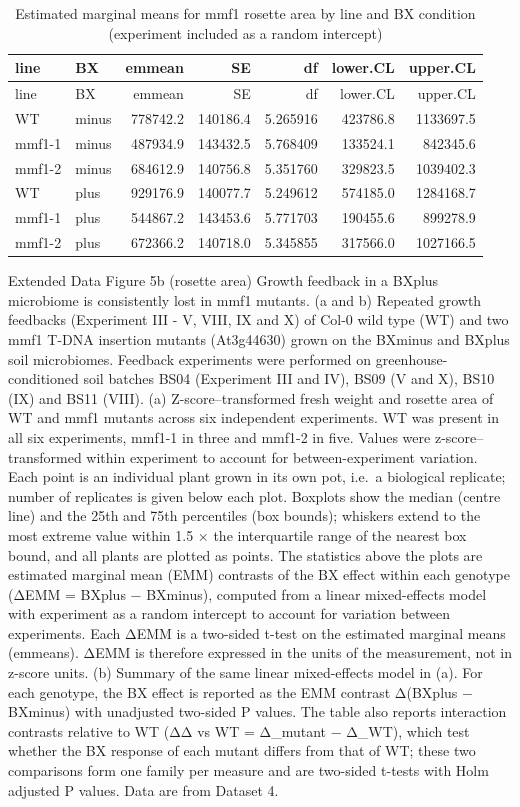 \documentclass[
  10pt,
]{article}
\begin{document}
\begin{longtable}[]{@{}llrrrrr@{}}
\caption{Estimated marginal means for mmf1 rosette area by line and BX
condition (experiment included as a random intercept)}\tabularnewline
\toprule\noalign{}
line & BX & emmean & SE & df & lower.CL & upper.CL \\
\midrule\noalign{}
\endfirsthead
\toprule\noalign{}
line & BX & emmean & SE & df & lower.CL & upper.CL \\
\midrule\noalign{}
\endhead
\bottomrule\noalign{}
\endlastfoot
WT & minus & 778742.2 & 140186.4 & 5.265916 & 423786.8 & 1133697.5 \\
mmf1-1 & minus & 487934.9 & 143432.5 & 5.768409 & 133524.1 & 842345.6 \\
mmf1-2 & minus & 684612.9 & 140756.8 & 5.351760 & 329823.5 &
1039402.3 \\
WT & plus & 929176.9 & 140077.7 & 5.249612 & 574185.0 & 1284168.7 \\
mmf1-1 & plus & 544867.2 & 143453.6 & 5.771703 & 190455.6 & 899278.9 \\
mmf1-2 & plus & 672366.2 & 140718.0 & 5.345855 & 317566.0 & 1027166.5 \\
\end{longtable}

Extended Data Figure 5b (rosette area) \textbar{} Growth feedback in a
BXplus microbiome is consistently lost in mmf1 mutants. (a and b)
Repeated growth feedbacks (Experiment III - V, VIII, IX and X) of Col-0
wild type (WT) and two mmf1 T-DNA insertion mutants (At3g44630) grown on
the BXminus and BXplus soil microbiomes. Feedback experiments were
performed on greenhouse-conditioned soil batches BS04 (Experiment III
and IV), BS09 (V and X), BS10 (IX) and BS11 (VIII). (a)
Z-score--transformed fresh weight and rosette area of WT and mmf1
mutants across six independent experiments. WT was present in all six
experiments, mmf1-1 in three and mmf1-2 in five. Values were
z-score--transformed within experiment to account for between-experiment
variation. Each point is an individual plant grown in its own pot,
i.e.~a biological replicate; number of replicates is given below each
plot. Boxplots show the median (centre line) and the 25th and 75th
percentiles (box bounds); whiskers extend to the most extreme value
within 1.5 × the interquartile range of the nearest box bound, and all
plants are plotted as points. The statistics above the plots are
estimated marginal mean (EMM) contrasts of the BX effect within each
genotype (ΔEMM = BXplus − BXminus), computed from a linear mixed-effects
model with experiment as a random intercept to account for variation
between experiments. Each ΔEMM is a two-sided t-test on the estimated
marginal means (emmeans). ΔEMM is therefore expressed in the units of
the measurement, not in z-score units. (b) Summary of the same linear
mixed-effects model in (a). For each genotype, the BX effect is reported
as the EMM contrast Δ(BXplus − BXminus) with unadjusted two-sided P
values. The table also reports interaction contrasts relative to WT (ΔΔ
vs WT = Δ\_mutant − Δ\_WT), which test whether the BX response of each
mutant differs from that of WT; these two comparisons form one family
per measure and are two-sided t-tests with Holm adjusted P values. Data
are from Dataset 4.
\end{document}

